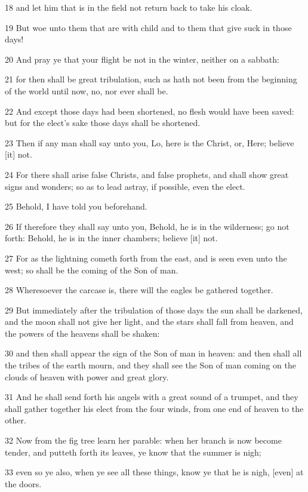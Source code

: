 \par 18 and let him that is in the field not return back to take his cloak.
\par 19 But woe unto them that are with child and to them that give suck in those days!
\par 20 And pray ye that your flight be not in the winter, neither on a sabbath:
\par 21 for then shall be great tribulation, such as hath not been from the beginning of the world until now, no, nor ever shall be.
\par 22 And except those days had been shortened, no flesh would have been saved: but for the elect's sake those days shall be shortened.
\par 23 Then if any man shall say unto you, Lo, here is the Christ, or, Here; believe [it] not.
\par 24 For there shall arise false Christs, and false prophets, and shall show great signs and wonders; so as to lead astray, if possible, even the elect.
\par 25 Behold, I have told you beforehand.
\par 26 If therefore they shall say unto you, Behold, he is in the wilderness; go not forth: Behold, he is in the inner chambers; believe [it] not.
\par 27 For as the lightning cometh forth from the east, and is seen even unto the west; so shall be the coming of the Son of man.
\par 28 Wheresoever the carcase is, there will the eagles be gathered together.
\par 29 But immediately after the tribulation of those days the sun shall be darkened, and the moon shall not give her light, and the stars shall fall from heaven, and the powers of the heavens shall be shaken:
\par 30 and then shall appear the sign of the Son of man in heaven: and then shall all the tribes of the earth mourn, and they shall see the Son of man coming on the clouds of heaven with power and great glory.
\par 31 And he shall send forth his angels with a great sound of a trumpet, and they shall gather together his elect from the four winds, from one end of heaven to the other.
\par 32 Now from the fig tree learn her parable: when her branch is now become tender, and putteth forth its leaves, ye know that the summer is nigh;
\par 33 even so ye also, when ye see all these things, know ye that he is nigh, [even] at the doors.
